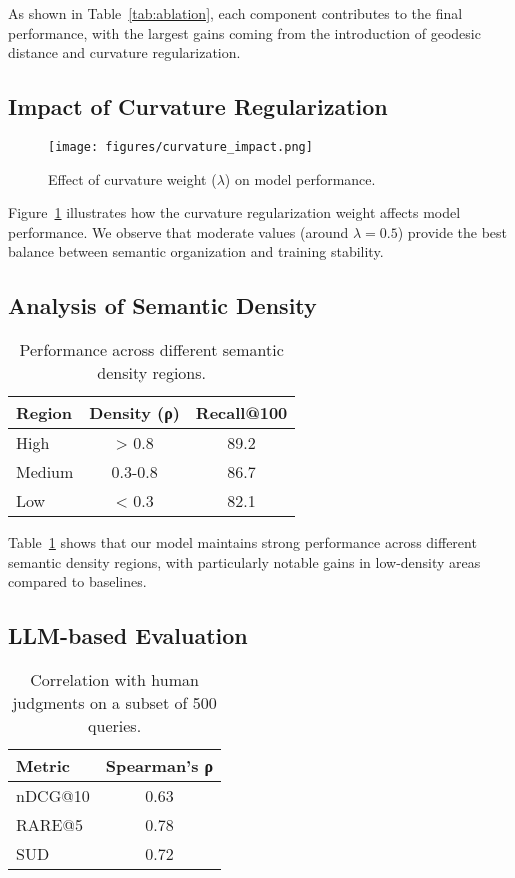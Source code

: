 As shown in Table~\ref{tab:ablation}, each component contributes to the final performance, with the largest gains coming from the introduction of geodesic distance and curvature regularization.

\subsection{Impact of Curvature Regularization}

\begin{figure}[h!]
\centering
\texttt{[image: figures/curvature\_impact.png]}
\caption{Effect of curvature weight ($\lambda$) on model performance.}
\label{fig:curvature_impact}
\end{figure}

Figure~\ref{fig:curvature_impact} illustrates how the curvature regularization weight affects model performance. We observe that moderate values (around $\lambda=0.5$) provide the best balance between semantic organization and training stability.

\subsection{Analysis of Semantic Density}

\begin{table}[h!]
\centering
\caption{Performance across different semantic density regions.}
\begin{tabular}{lcc}
\hline
\textbf{Region} & \textbf{Density (ρ)} & \textbf{Recall@100} \\
\hline
High & > 0.8 & 89.2 \\
Medium & 0.3-0.8 & 86.7 \\
Low & < 0.3 & 82.1 \\
\hline
\end{tabular}
\label{tab:density}
\end{table}

Table~\ref{tab:density} shows that our model maintains strong performance across different semantic density regions, with particularly notable gains in low-density areas compared to baselines.

\subsection{LLM-based Evaluation}

\begin{table}[h!]
\centering
\caption{Correlation with human judgments on a subset of 500 queries.}
\begin{tabular}{lc}
\textbf{Metric} & \textbf{Spearman's ρ} \\
\hline
nDCG@10 & 0.63 \\
RARE@5 & 0.78 \\
SUD & 0.72 \\
\hline
\end{tabular}
\label{tab:correlation}
\end{table}

